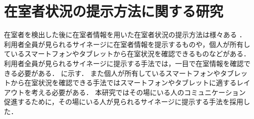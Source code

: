 \section{在室者状況の提示方法に関する研究}\label{2.3}
在室者を検出した後に在室者情報を用いた在室者状況の提示方法は様々ある
\cite{picture}
\cite{iptelephone}
\cite{staycomment}
\cite{kasika}
\cite{zaiseki}．
利用者全員が見られるサイネージに在室者情報を提示するものや，個人が所有しているスマートフォンやタブレットから在室状況を確認できるものなどがある．
利用者全員が見られるサイネージに提示する手法では，一目で在室情報を確認できる必要がある．
に示す．
また個人が所有しているスマートフォンやタブレットから在室状況を確認できる手法ではスマートフォンやタブレットに適するレイアウトを考える必要がある．
本研究ではその場にいる人のコミュニケーション促進するために，その場にいる人が見られるサイネージに提示する手法を採用した．


